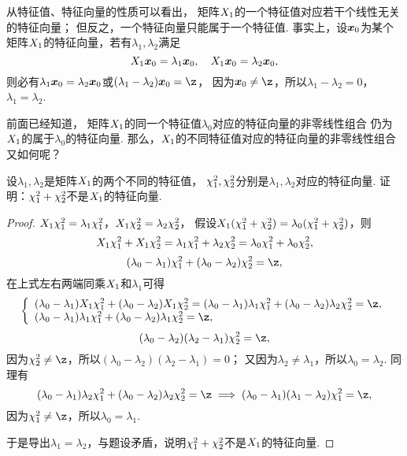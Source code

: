 从特征值、特征向量的性质可以看出，
矩阵\(X_1\)的一个特征值对应若干个线性无关的特征向量；
但反之，一个特征向量只能属于一个特征值.
事实上，设\(\boldsymbol{x}_0\)为某个矩阵\(X_1\)的特征向量，若有\(\lambda_1,\lambda_2\)满足\[
	X_1\boldsymbol{x}_0=\lambda_1\boldsymbol{x}_0,
	\quad
	X_1\boldsymbol{x}_0=\lambda_2\boldsymbol{x}_0,
\]
则必有\(\lambda_1\boldsymbol{x}_0=\lambda_2\boldsymbol{x}_0\)或\((\lambda_1-\lambda_2)\vb{x}_0=\z\)，
因为\(\vb{x}_0\neq\z\)，所以\(\lambda_1-\lambda_2=0\)，\(\lambda_1=\lambda_2\).

前面已经知道，
矩阵\(X_1\)的同一个特征值\(\lambda_0\)对应的特征向量的非零线性组合
仍为\(X_1\)的属于\(\lambda_0\)的特征向量.
那么，\(X_1\)的不同特征值对应的特征向量的非零线性组合又如何呢？
\begin{example}
设\(\lambda_1,\lambda_2\)是矩阵\(X_1\)的两个不同的特征值，
\(\chi^2_1,\chi^2_2\)分别是\(\lambda_1,\lambda_2\)对应的特征向量.
证明：\(\chi^2_1+\chi^2_2\)不是\(X_1\)的特征向量.
\begin{proof}
\(X_1\chi^2_1 = \lambda_1\chi^2_1\)，\(X_1\chi^2_2 = \lambda_2\chi^2_2\)，
假设\(X_1(\chi^2_1+\chi^2_2) = \lambda_0(\chi^2_1+\chi^2_2)\)，则\[
	X_1\chi^2_1+X_1\chi^2_2 =\lambda_1\chi^2_1+\lambda_2\chi^2_2 = \lambda_0\chi^2_1+\lambda_0\chi^2_2,
\]\[
	(\lambda_0-\lambda_1)\x_1+(\lambda_0-\lambda_2)\x_2 = \z,
\]
在上式左右两端同乘\(X_1\)和\(\lambda_1\)可得\[
	\left\{ \begin{array}{l}
		(\lambda_0-\lambda_1)\A\x_1+(\lambda_0-\lambda_2)\A\x_2 = (\lambda_0-\lambda_1)\lambda_1\x_1 + (\lambda_0-\lambda_2)\lambda_2\x_2 = \z, \\
		(\lambda_0-\lambda_1)\lambda_1\x_1+(\lambda_0-\lambda_2)\lambda_1\x_2 = \z,
	\end{array} \right.
\]\[
	(\lambda_0-\lambda_2)(\lambda_2-\lambda_1)\x_2 = \z,
\]
因为\(\x_2\neq\z\)，所以\((\lambda_0-\lambda_2)(\lambda_2-\lambda_1)=0\)；
又因为\(\lambda_2\neq\lambda_1\)，所以\(\lambda_0=\lambda_2\).
同理有\[
	(\lambda_0-\lambda_1)\lambda_2\x_1+(\lambda_0-\lambda_2)\lambda_2\x_2 = \z
	\implies
	(\lambda_0-\lambda_1)(\lambda_1-\lambda_2)\x_1 = \z,
\]
因为\(\x_1\neq\z\)，所以\(\lambda_0=\lambda_1\).

于是导出\(\lambda_1=\lambda_2\)，与题设矛盾，说明\(\chi^2_1+\chi^2_2\)不是\(X_1\)的特征向量.
\end{proof}
\end{example}

